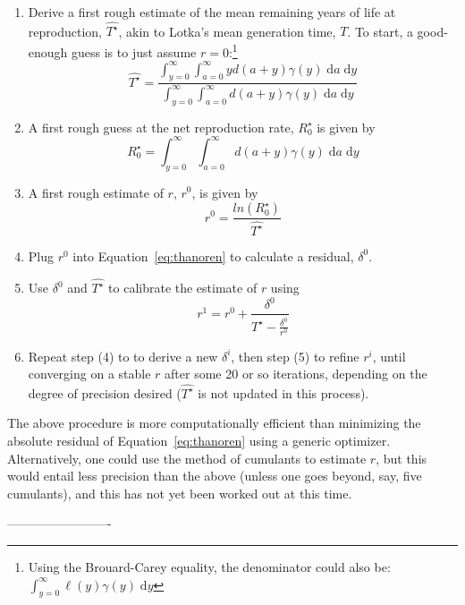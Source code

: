 \documentclass{article}
\newcommand{\dd}{\; \mathrm{d}}
\begin{document}
\begin{appendices}
\begin{enumerate}
  \item Derive a first rough estimate of the mean remaining years of life at
  reproduction, $\widehat{T^\star}$, akin to Lotka's mean generation time, $T$.
  To start, a good-enough guess is to just assume $r=0$:\footnote{Using the
  Brouard-Carey equality, the denominator could also be: $\int _{y=0}^\infty
  \ell(y) \gamma(y) \dd y$}
\begin{equation}
\widehat{T^\star} = \frac{\int _{y=0}^\infty \int _{a=0}^\infty y d (a+y)
\gamma(y) \dd a \dd y}{\int _{y=0}^\infty \int _{a=0}^\infty d(a+y) \gamma(y)
\dd a \dd y}
\end{equation}
  \item A first rough guess at the net reproduction rate, $R_0^\star$ is given
  by
 \begin{equation}
  R_0^\star = \int _{y=0}^\infty \int _{a=0}^\infty d(a+y) \gamma(y) \dd a
\dd y
\end{equation}
  \item A first rough estimate of $r$, $r^0$, is given by
   \begin{equation}
   r^0 = \frac{ln(R_0^\star)}{\widehat{T^\star}}
   \end{equation}
  \item Plug $r^0$ into Equation~\eqref{eq:thanoren} to calculate a
  residual, $\delta^0$.
  \item Use $\delta^0$ and $\widehat{T^\star}$ to calibrate the estimate of $r$
  using
  \begin{equation}
  r^{1} = r^0 + \frac{\delta^0}{\widehat{T^\star} - \frac{\delta^0}{r^0}}
  \end{equation}
  \item Repeat step (4) to to derive a new $\delta^i$, then step (5) to refine
  $r^i$, until converging on a stable $r$ after some 20 or so iterations,
  depending on the degree of precision desired ($\widehat{T^\star}$ is not updated
  in this process).
\end{enumerate}

The above procedure is more computationally efficient than minimizing the
absolute residual of Equation~\eqref{eq:thanoren} using a generic
optimizer. Alternatively, one could use the method of cumulants to estimate $r$,
but this would entail less precision than the above (unless one goes beyond,
say, five cumulants), and this has not yet been worked out at this time.
 
 
\end{appendices}
\nocite{HMD,HFD}
-------------------------

    
\end{document}

